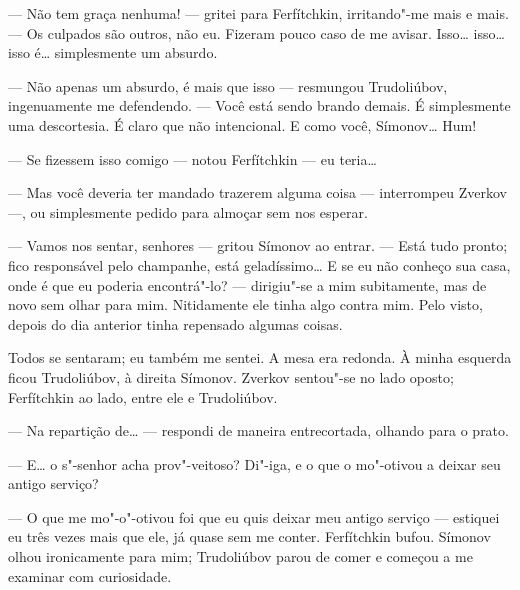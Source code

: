 --- Não tem graça nenhuma! --- gritei para Ferfítchkin, irritando"-me mais e
mais. --- Os culpados são outros, não eu. Fizeram pouco caso de me
avisar. Isso\ldots{} isso\ldots{} isso é\ldots{} simplesmente um absurdo.

--- Não apenas um absurdo, é mais que isso --- resmungou Trudoliúbov,
ingenuamente me defendendo. --- Você está sendo brando demais. É
simplesmente uma descortesia. É claro que não intencional. E como você,
Símonov\ldots{} Hum!

--- Se fizessem isso comigo --- notou Ferfítchkin --- eu teria\ldots{}

--- Mas você deveria ter mandado trazerem alguma coisa --- interrompeu
Zverkov ---, ou simplesmente pedido para almoçar sem nos esperar.


--- Vamos nos sentar, senhores --- gritou Símonov ao entrar. --- Está tudo
pronto; fico responsável pelo champanhe, está geladíssimo\ldots{} E se eu
não conheço sua casa, onde é que eu poderia encontrá"-lo? --- dirigiu"-se
a mim subitamente, mas de novo sem olhar para mim. Nitidamente ele
tinha algo contra mim. Pelo visto, depois do dia anterior tinha
repensado algumas coisas.

Todos se sentaram; eu também me sentei. A mesa era redonda. À minha
esquerda ficou Trudoliúbov, à direita Símonov. Zverkov sentou"-se no
lado oposto; Ferfítchkin ao lado, entre ele e Trudoliúbov.


--- Na repartição de\ldots{} --- respondi de maneira entrecortada, olhando para o
prato.

--- E\ldots{} o s"-senhor acha prov"-veitoso? Di"-iga, e o que o mo"-otivou a
deixar seu antigo serviço?

--- O que me mo"-o"-otivou foi que eu quis deixar meu antigo serviço ---
estiquei eu três vezes mais que ele, já quase sem me conter.
Ferfítchkin bufou. Símonov olhou ironicamente para mim; Trudoliúbov
parou de comer e começou a me examinar com curiosidade.

